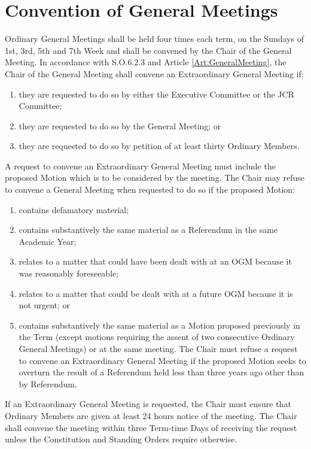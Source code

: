 \section{Convention of General Meetings}
\npara Ordinary General Meetings shall be held four times each term, on the Sundays of 1st, 3rd, 5th and 7th Week and shall be convened by the Chair of the General Meeting.
\npara In accordance with S.O.6.2.3 and Article \ref{Art:GeneralMeeting}, the Chair of the General Meeting shall convene an Extraordinary General Meeting if:
\begin{enumerate}
\item they are requested to do so by either the Executive Committee or the JCR Committee;
\item they are requested to do so by the General Meeting; or
\item they are requested to do so by petition of at least thirty Ordinary Members.
\end{enumerate}
\npara A request to convene an Extraordinary General Meeting must include the proposed Motion which is to be considered by the meeting.  The Chair may refuse to convene a General Meeting when requested to do so if the proposed Motion:
\begin{enumerate}
\item contains defamatory material;
\item contains substantively the same material as a Referendum in the same Academic Year;
\item relates to a matter that could have been dealt with at an OGM because it was reasonably foreseeable;
\item relates to a matter that could be dealt with at a future OGM because it is not urgent; or
\item contains substantively the same material as a Motion proposed previously in the Term (except motions requiring the assent of two consecutive Ordinary General Meetings) or at the same meeting.
The Chair must refuse a request to convene an Extraordinary General Meeting if the proposed Motion seeks to overturn the result of a Referendum held less than three years ago other than by Referendum.
\end{enumerate}
\npara If an Extraordinary General Meeting is requested, the Chair must ensure that Ordinary Members are given at least 24 hours notice of the meeting.  The Chair shall convene the meeting within three Term-time Days of receiving the request unless the Constitution and Standing Orders require otherwise.

